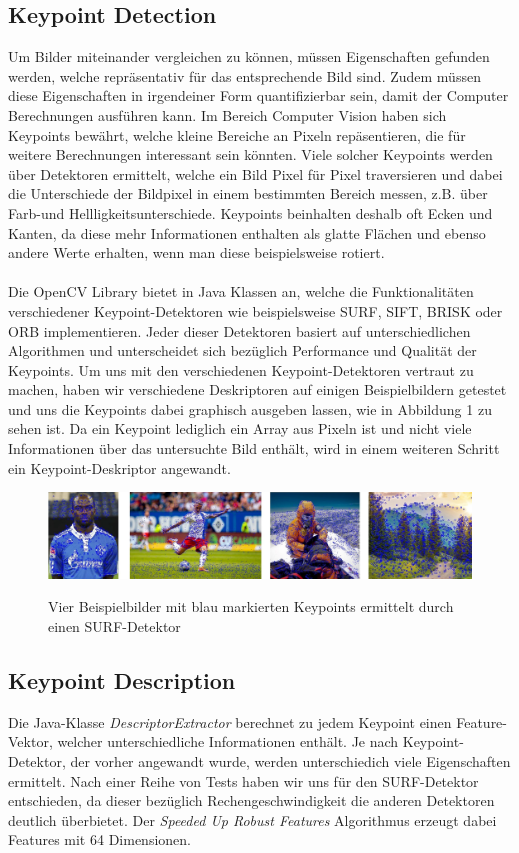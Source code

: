 \documentclass{scrartcl}
\begin{document}
\subsection{Keypoint Detection}
Um Bilder miteinander vergleichen zu können, müssen Eigenschaften gefunden werden, welche repräsentativ für das entsprechende Bild sind. Zudem müssen diese Eigenschaften in irgendeiner Form quantifizierbar sein, damit der Computer Berechnungen ausführen kann. Im Bereich Computer Vision haben sich Keypoints bewährt, welche kleine Bereiche an Pixeln repäsentieren, die für weitere Berechnungen interessant sein könnten. Viele solcher Keypoints werden über Detektoren ermittelt, welche ein Bild Pixel für Pixel traversieren und dabei die Unterschiede der Bildpixel in einem bestimmten Bereich messen, z.B. über Farb-und Hellligkeitsunterschiede. Keypoints beinhalten deshalb oft Ecken und Kanten, da diese mehr Informationen enthalten als glatte Flächen und ebenso andere Werte erhalten, wenn man diese beispielsweise rotiert.
\\
\\
Die OpenCV Library bietet in Java Klassen an, welche die Funktionalitäten verschiedener Keypoint-Detektoren wie beispielsweise SURF, SIFT, BRISK oder ORB implementieren. Jeder dieser Detektoren basiert auf unterschiedlichen Algorithmen und unterscheidet sich bezüglich Performance und Qualität der Keypoints. Um uns mit den verschiedenen Keypoint-Detektoren vertraut zu machen, haben wir verschiedene Deskriptoren auf einigen Beispielbildern getestet und uns die Keypoints dabei graphisch ausgeben lassen, wie in Abbildung 1 zu sehen ist. Da ein Keypoint lediglich ein Array aus Pixeln ist und nicht viele Informationen über das untersuchte Bild enthält, wird in einem weiteren Schritt ein Keypoint-Deskriptor angewandt. 
\begin{figure}[h]
\begin{center}
\includegraphics[scale=0.72]{keypoints.jpg}
\label{fig:keypoints}
\caption{Vier Beispielbilder mit blau markierten Keypoints ermittelt durch einen SURF-Detektor}
\end{center}
\end{figure}

\subsection{Keypoint Description}
Die Java-Klasse \textit{DescriptorExtractor} berechnet zu jedem Keypoint einen Feature-Vektor, welcher unterschiedliche Informationen enthält. Je nach Keypoint-Detektor, der vorher angewandt wurde, werden unterschiedich viele Eigenschaften ermittelt. Nach einer Reihe von Tests haben wir uns für den SURF-Detektor entschieden, da dieser bezüglich Rechengeschwindigkeit die anderen Detektoren deutlich überbietet. Der \textit{Speeded Up Robust Features} Algorithmus erzeugt dabei Features mit 64 Dimensionen. 
\end{document}
